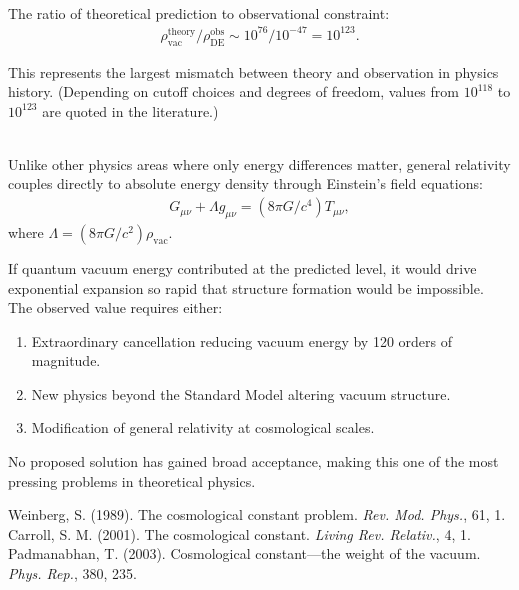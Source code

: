 \begin{technical}
\medskip

\\
The ratio of theoretical prediction to observational constraint:
\begin{align*}
\rho_{\text{vac}}^{\text{theory}}/\rho_{\text{DE}}^{\text{obs}} \sim 10^{76}/10^{-47} = 10^{123}.
\end{align*}

This represents the largest mismatch between theory and observation in physics history. (Depending on cutoff choices and degrees of freedom, values from $10^{118}$ to $10^{123}$ are quoted in the literature.)

\medskip

\\
Unlike other physics areas where only energy differences matter, general relativity couples directly to absolute energy density through Einstein's field equations:
\begin{align*}
G_{\mu\nu} + \Lambda g_{\mu\nu} = (8\pi G/c^4) T_{\mu\nu},
\end{align*}
where $\Lambda = (8\pi G/c^2) \rho_{\text{vac}}$.

If quantum vacuum energy contributed at the predicted level, it would drive exponential expansion so rapid that structure formation would be impossible. The observed value requires either:

\begin{enumerate}
\item Extraordinary cancellation reducing vacuum energy by 120 orders of magnitude.
\item New physics beyond the Standard Model altering vacuum structure.
\item Modification of general relativity at cosmological scales.
\end{enumerate}

No proposed solution has gained broad acceptance, making this one of the most pressing problems in theoretical physics.

\medskip

\techref
{\footnotesize
Weinberg, S. (1989). The cosmological constant problem. \textit{Rev. Mod. Phys.}, 61, 1.\\
Carroll, S. M. (2001). The cosmological constant. \textit{Living Rev. Relativ.}, 4, 1.\\
Padmanabhan, T. (2003). Cosmological constant—the weight of the vacuum. \textit{Phys. Rep.}, 380, 235.
}
\end{technical}
